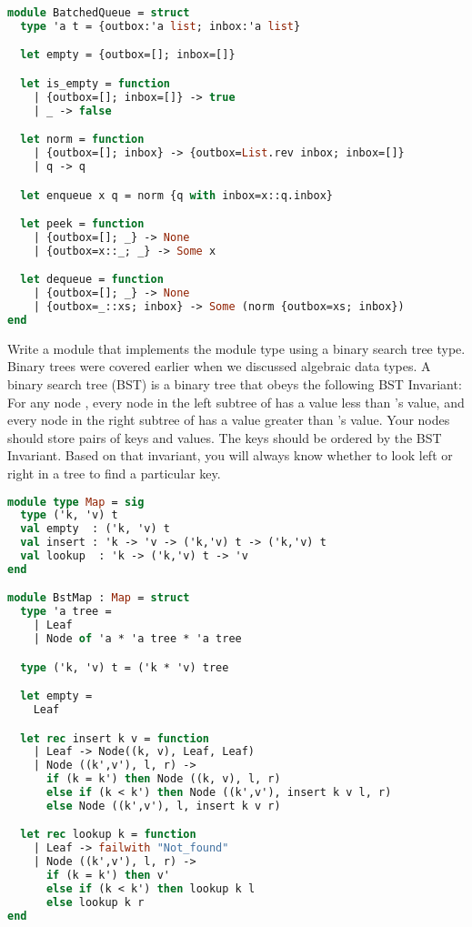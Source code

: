 \begin{lstlisting}[language=OCaml]
module BatchedQueue = struct
  type 'a t = {outbox:'a list; inbox:'a list}

  let empty = {outbox=[]; inbox=[]}

  let is_empty = function
    | {outbox=[]; inbox=[]} -> true
    | _ -> false

  let norm = function
    | {outbox=[]; inbox} -> {outbox=List.rev inbox; inbox=[]}
    | q -> q

  let enqueue x q = norm {q with inbox=x::q.inbox}

  let peek = function
    | {outbox=[]; _} -> None
    | {outbox=x::_; _} -> Some x

  let dequeue = function
    | {outbox=[]; _} -> None
    | {outbox=_::xs; inbox} -> Some (norm {outbox=xs; inbox})
end
\end{lstlisting}

Write a module  that implements the  module type using a binary search tree type. Binary trees were covered earlier when we discussed algebraic data types. A binary search tree (BST) is a binary tree that obeys the following BST Invariant:
For any node , every node in the left subtree of  has a value less than 's value, and every node in the right subtree of  has a value greater than 's value.
Your nodes should store pairs of keys and values. The keys should be ordered by the BST Invariant. Based on that invariant, you will always know whether to look left or right in a tree to find a particular key.

\begin{lstlisting}[language=OCaml]
module type Map = sig
  type ('k, 'v) t
  val empty  : ('k, 'v) t
  val insert : 'k -> 'v -> ('k,'v) t -> ('k,'v) t
  val lookup  : 'k -> ('k,'v) t -> 'v
end

module BstMap : Map = struct
  type 'a tree =
    | Leaf
    | Node of 'a * 'a tree * 'a tree

  type ('k, 'v) t = ('k * 'v) tree

  let empty =
    Leaf

  let rec insert k v = function
    | Leaf -> Node((k, v), Leaf, Leaf)
    | Node ((k',v'), l, r) ->
      if (k = k') then Node ((k, v), l, r)
      else if (k < k') then Node ((k',v'), insert k v l, r)
      else Node ((k',v'), l, insert k v r)

  let rec lookup k = function
    | Leaf -> failwith "Not_found"
    | Node ((k',v'), l, r) ->
      if (k = k') then v'
      else if (k < k') then lookup k l
      else lookup k r
end
\end{lstlisting}

